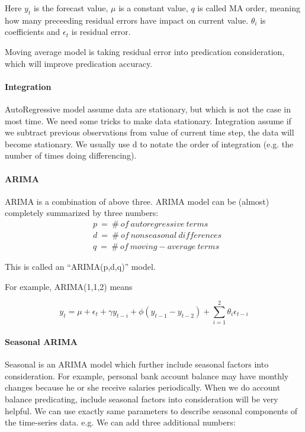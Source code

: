 \documentclass[10pt,twocolumn,letterpaper]{article}
\begin{document}
Here $y_t$ is the forecast value, $\mu$ is a constant value, $q$ is called MA order, meaning how many preceeding residual errors have impact on current value. $\theta_i$ is coefficients and $\epsilon_t$ is residual error.

Moving average model is taking residual error into predication consideration, which will improve predication accuracy.

\paragraph{Integration}
\par
AutoRegressive model assume data are stationary, but which is not the case in most time. We need some tricks to make data stationary. Integration assume if we subtract previous observations from value of current time step, the data will become stationary. We usually use d to notate the order of integration (e.g. the number of times doing differencing).

\paragraph{ARIMA}
\par
ARIMA is a combination of above three. ARIMA model can be (almost) completely summarized by three numbers: 
\begin{equation*}
	\begin{aligned}
	&p\ =\ \#\ of\ autoregressive\ terms \\ 
	&d\ =\ \#\ of\ nonseasonal\ differences \\  
	&q\ =\ \#\ of\ moving-average\ terms 
	\end{aligned}
\end{equation*}

\par

This is called an “ARIMA(p,d,q)” model. 

For example, ARIMA(1,1,2) means

\par
\begin{equation*}
y_t = \mu + \epsilon_t + \gamma y_{t-i} + \phi(y_{t-1} - y_{t-2} ) + \sum_{i=1}^{2}\theta_i\epsilon_{t-i} 
\end{equation*}



\paragraph{Seasonal ARIMA}
\par
Seasonal is an ARIMA model which further include seasonal factors into consideration. For example, personal bank account balance may have monthly changes because he or she receive salaries periodically. When we do account balance predicating, include seasonal factors into consideration will be very helpful.
We can use exactly same parameters to describe seasonal components of the time-series data. e.g. We can add three additional numbers: 
\end{document}
